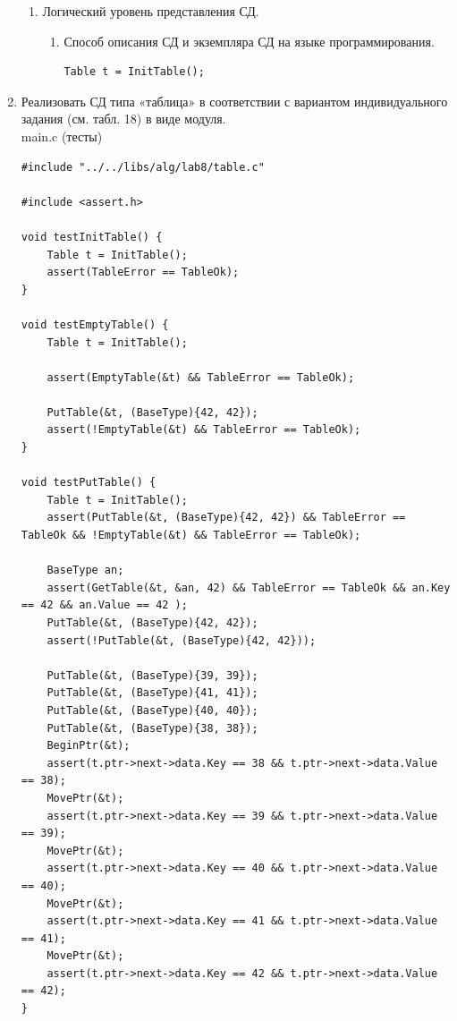 \documentclass[a4paper,14pt]{extarticle}
\begin{document}
\begin{enumerate}
\begin{enumerate}[label*=\arabic*.]
		      \item Логический уровень представления СД.
		            \begin{enumerate}[label*=\arabic*.]
			            \item Способ описания СД и экземпляра СД на языке программирования.\\
						\begin{verbatim}
Table t = InitTable();
												  \end{verbatim}
		            \end{enumerate}
	      \end{enumerate}
		  \item Реализовать СД типа «таблица» в соответствии с 
          вариантом индивидуального задания (см. табл. 18) в виде модуля.\\
main.c (тесты)
		  \begin{verbatim}
#include "../../libs/alg/lab8/table.c"

#include <assert.h>

void testInitTable() {
    Table t = InitTable();
    assert(TableError == TableOk);
}

void testEmptyTable() {
    Table t = InitTable();
    
    assert(EmptyTable(&t) && TableError == TableOk);

    PutTable(&t, (BaseType){42, 42});
    assert(!EmptyTable(&t) && TableError == TableOk);
}

void testPutTable() {
    Table t = InitTable();
    assert(PutTable(&t, (BaseType){42, 42}) && TableError == TableOk && !EmptyTable(&t) && TableError == TableOk);

    BaseType an;
    assert(GetTable(&t, &an, 42) && TableError == TableOk && an.Key == 42 && an.Value == 42 );
    PutTable(&t, (BaseType){42, 42});
    assert(!PutTable(&t, (BaseType){42, 42}));

    PutTable(&t, (BaseType){39, 39});
    PutTable(&t, (BaseType){41, 41});
    PutTable(&t, (BaseType){40, 40});
    PutTable(&t, (BaseType){38, 38});
    BeginPtr(&t);
    assert(t.ptr->next->data.Key == 38 && t.ptr->next->data.Value == 38);
    MovePtr(&t);
    assert(t.ptr->next->data.Key == 39 && t.ptr->next->data.Value == 39);
    MovePtr(&t);
    assert(t.ptr->next->data.Key == 40 && t.ptr->next->data.Value == 40);
    MovePtr(&t);
    assert(t.ptr->next->data.Key == 41 && t.ptr->next->data.Value == 41);
    MovePtr(&t);
    assert(t.ptr->next->data.Key == 42 && t.ptr->next->data.Value == 42);
}


\end{verbatim}
\end{enumerate}
\end{document}
